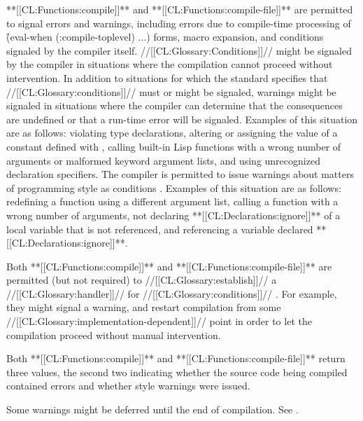 \endsubSection%

 


 

**[[CL:Functions:compile]]** and **[[CL:Functions:compile-file]]** are permitted to signal errors and warnings, including errors due to compile-time processing of \f{(eval-when (:compile-toplevel) ...)} forms, macro expansion, and conditions signaled by the compiler itself.
                                                 //[[CL:Glossary:Conditions]]//  might be signaled by the compiler in situations where the compilation cannot proceed without intervention.  
  In addition to situations for which the standard specifies that //[[CL:Glossary:conditions]]//  must or might be signaled, warnings might be signaled in situations where the compiler can determine that the consequences are undefined or that a run-time error will be signaled.  Examples of this situation are as follows: 
    violating type declarations,
    altering or assigning the value of a constant defined with ,
    calling built-in Lisp functions with a wrong number of arguments or malformed keyword
      argument lists,  and using unrecognized declaration specifiers.
  The compiler is permitted to issue warnings about matters of programming style as conditions . Examples of this situation are as follows:
      redefining a function using a different argument list,
      calling a function with a wrong number of arguments,
      not declaring **[[CL:Declarations:ignore]]** of a local variable that is not referenced,
  and referencing a variable declared **[[CL:Declarations:ignore]]**.

Both **[[CL:Functions:compile]]** and **[[CL:Functions:compile-file]]** are permitted (but not required) to //[[CL:Glossary:establish]]// a //[[CL:Glossary:handler]]// for //[[CL:Glossary:conditions]]// .  For example, they might signal a warning, and restart compilation from some //[[CL:Glossary:implementation-dependent]]// point in order to let the  compilation proceed without manual intervention.

Both **[[CL:Functions:compile]]** and **[[CL:Functions:compile-file]]** return three values, the second two indicating whether the source code being compiled contained errors and whether style warnings were issued.
 

  Some warnings might be deferred until the end of compilation.  See .

\endsubSection%

